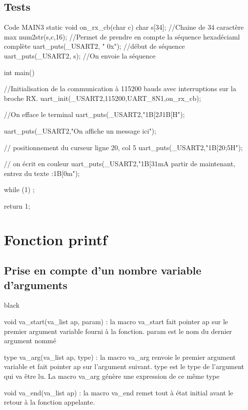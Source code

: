 {\section{Tests}

\begin{Cpp}{Code MAIN3}
static void on_rx_cb(char c)
{
	char  s[34];				//Chaine de 34 caractère max
	num2str(s,c,16);			//Permet de prendre en compte la séquence hexadéciaml complète
	uart_puts(_USART2, " 0x");	//début de séquence
	uart_puts(_USART2, s);		//On envoie la séquence
}


int main()
{
	//Initialisation de la communication à 115200 bauds avec interruptions sur la broche RX.
	uart_init(_USART2,115200,UART_8N1,on_rx_cb);

	//On efface le terminal
	uart_puts(_USART2,"\x1B[2J\x1B[H");

	uart_puts(_USART2,"On affiche un message ici");

	// positionnement du curseur ligne 20, col 5
	uart_puts(_USART2,"\x1B[20;5H");

	// on écrit en couleur
	uart_puts(_USART2,"\x1B[31mA partir de maintenant, entrez du texte :\x1B[0m");

	while (1) ;

	return 1;
}
\end{Cpp}
\chapter{Fonction printf}

\section{Prise en compte d'un nombre variable d'arguments}

\begin{items}{black}{\Bullet}

\item void va\_start(va\_list ap, param) : la macro va\_start fait pointer ap
sur le premier argument variable fourni à la fonction. param est le nom du
dernier argument nommé

\item type va\_arg(va\_list ap, type) : la macro va\_arg renvoie le premier
argument variable et fait pointer ap sur l'argument suivant. type est le type de
l'argument qui va être lu. La macro va\_arg génère une expression de ce même
type
\item void va\_end(va\_list ap) : la macro va\_end remet tout à état initial avant
le retour à la fonction appelante.
\end{items}

}
